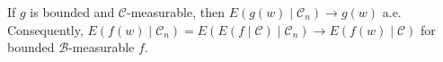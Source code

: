 If $g$ is bounded and $\mathcal{C}$-measurable, then $E(g(w) \mid \mathcal{C}_n) \to g(w)$ a.e. Consequently, $E(f(w) \mid \mathcal{C}_n) = E(E(f \mid \mathcal{C}) \mid \mathcal{C}_n) \to E(f(w) \mid \mathcal{C})$ for bounded $\mathcal{B}$-measurable $f$.
